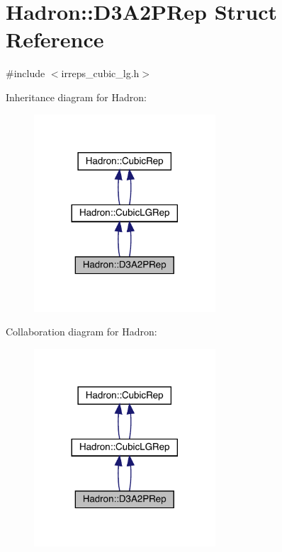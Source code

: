 \hypertarget{structHadron_1_1D3A2PRep}{}\section{Hadron\+:\+:D3\+A2\+P\+Rep Struct Reference}
\label{structHadron_1_1D3A2PRep}


{\ttfamily \#include $<$irreps\+\_\+cubic\+\_\+lg.\+h$>$}



Inheritance diagram for Hadron\+:\nopagebreak
\begin{figure}[H]
\begin{center}
\leavevmode
\includegraphics[width=192pt]{de/dd9/structHadron_1_1D3A2PRep__inherit__graph}
\end{center}
\end{figure}


Collaboration diagram for Hadron\+:\nopagebreak
\begin{figure}[H]
\begin{center}
\leavevmode
\includegraphics[width=192pt]{d2/dc8/structHadron_1_1D3A2PRep__coll__graph}
\end{center}
\end{figure}
